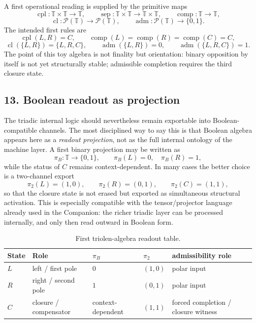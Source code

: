 A first operational reading is supplied by the primitive maps
\[
\operatorname{cpl}:\mathbb T\times\mathbb T\to\mathbb T,
\qquad
\operatorname{sep}:\mathbb T\times\mathbb T\to\mathbb T\times\mathbb T,
\qquad
\operatorname{comp}:\mathbb T\to\mathbb T,
\]
\[
\operatorname{cl}:\mathcal P(\mathbb T)\to\mathcal P(\mathbb T),
\qquad
\operatorname{adm}:\mathcal P(\mathbb T)\to\{0,1\}.
\]
The intended first rules are
\[
\operatorname{cpl}(L,R)=C,
\qquad
\operatorname{comp}(L)=\operatorname{comp}(R)=\operatorname{comp}(C)=C,
\]
\[
\operatorname{cl}(\{L,R\})=\{L,R,C\},
\qquad
\operatorname{adm}(\{L,R\})=0,
\qquad
\operatorname{adm}(\{L,R,C\})=1.
\]
The point of this toy algebra is not finality but orientation: binary opposition by itself is not yet structurally stable; admissible completion requires the third closure state.

\subsection*{13. Boolean readout as projection}
The triadic internal logic should nevertheless remain exportable into Boolean-compatible channels. The most disciplined way to say this is that Boolean algebra appears here as a \emph{readout projection}, not as the full internal ontology of the machine layer. A first binary projection may be written as
\[
\pi_B:\mathbb T\to\{0,1\},
\qquad
\pi_B(L)=0,
\quad
\pi_B(R)=1,
\]
while the status of $C$ remains context-dependent. In many cases the better choice is a two-channel export
\[
\pi_2(L)=(1,0),
\qquad
\pi_2(R)=(0,1),
\qquad
\pi_2(C)=(1,1),
\]
so that the closure state is not erased but exported as simultaneous structural activation. This is especially compatible with the tensor/projector language already used in the Companion: the richer triadic layer can be processed internally, and only then read outward in Boolean form.

\begin{table}[h]
\centering
\caption{First triolen-algebra readout table.}
\begin{tabular}{>{\raggedright\arraybackslash}p{} >{\centering\arraybackslash}p{} >{\centering\arraybackslash}p{} >{\centering\arraybackslash}p{} >{\centering\arraybackslash}p{}}
\toprule
State & Role & $\pi_B$ & $\pi_2$ & admissibility role \\
\midrule
$L$ & left / first pole & $0$ & $(1,0)$ & polar input \\
$R$ & right / second pole & $1$ & $(0,1)$ & polar input \\
$C$ & closure / compensator & context-dependent & $(1,1)$ & forced completion / closure witness \\
\bottomrule
\end{tabular}
\end{table}

